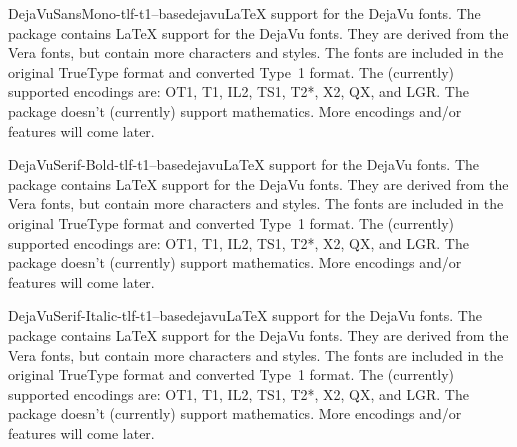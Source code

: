 \documentclass{ddltxtyp}
\begin{document}

\begin{package}{DejaVuSansMono-tlf-t1--base}{dejavu}{{\LaTeX} support for the DejaVu fonts.}
The package contains {\LaTeX} support for the DejaVu fonts. They
are derived from the Vera fonts, but contain more characters
and styles. The fonts are included in the original TrueType
format and converted Type~1 format. The (currently) supported
encodings are: OT1, T1, IL2, TS1, T2*, X2, QX, and LGR. The
package doesn't (currently) support mathematics. More encodings
and/or features will come later.
\end{package}

\begin{package}{DejaVuSerif-Bold-tlf-t1--base}{dejavu}{{\LaTeX} support for the DejaVu fonts.}
The package contains {\LaTeX} support for the DejaVu fonts. They
are derived from the Vera fonts, but contain more characters
and styles. The fonts are included in the original TrueType
format and converted Type~1 format. The (currently) supported
encodings are: OT1, T1, IL2, TS1, T2*, X2, QX, and LGR. The
package doesn't (currently) support mathematics. More encodings
and/or features will come later.
\end{package}


\begin{package}{DejaVuSerif-Italic-tlf-t1--base}{dejavu}{{\LaTeX} support for the DejaVu fonts.}
The package contains {\LaTeX} support for the DejaVu fonts. They
are derived from the Vera fonts, but contain more characters
and styles. The fonts are included in the original TrueType
format and converted Type~1 format. The (currently) supported
encodings are: OT1, T1, IL2, TS1, T2*, X2, QX, and LGR. The
package doesn't (currently) support mathematics. More encodings
and/or features will come later.
\end{package}
\end{document}
